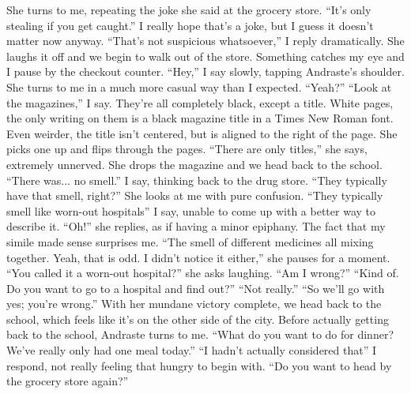 \documentclass[a4paper, 12pt]{book}
\newcommand\tab[1][1cm]{\hspace*{#1}}
\begin{document}
\newline
\tab
She turns to me, repeating the joke she said at the grocery store. ``It’s only stealing if you get caught.'' I really hope that’s a joke, but I guess it doesn’t matter now anyway.
\newline
\tab
``That’s not suspicious whatsoever,'' I reply dramatically. She laughs it off and we begin to walk out of the store. Something catches my eye and I pause by the checkout counter. ``Hey,'' I say slowly, tapping Andraste’s shoulder.
\newline
\tab
She turns to me in a much more casual way than I expected. ``Yeah?''
\newline
\tab
``Look at the magazines,'' I say. They’re all completely black, except a title. White pages, the only writing on them is a black magazine title in a Times New Roman font. Even weirder, the title isn’t centered, but is aligned to the right of the page.
\newline
\tab
She picks one up and flips through the pages. ``There are only titles,'' she says, extremely unnerved. She drops the magazine and we head back to the school.
\newline
\tab
``There was... no smell.'' I say, thinking back to the drug store. ``They typically have that smell, right?''  She looks at me with pure confusion. ``They typically smell like worn-out hospitals'' I say, unable to come up with a better way to describe it.
\newline
\tab
``Oh!'' she replies, as if having a minor epiphany. The fact that my simile made sense surprises me. ``The smell of different medicines all mixing together. Yeah, that is odd. I didn’t notice it either,'' she pauses for a moment. ``You called it a worn-out hospital?'' she asks laughing.
\newline
\tab
``Am I wrong?''
\newline
\tab
``Kind of. Do you want to go to a hospital and find out?''
\newline
\tab
``Not really.''
\newline
\tab
``So we’ll go with yes; you’re wrong.'' With her mundane victory complete, we head back to the school, which feels like it’s on the other side of the city. Before actually getting back to the school, Andraste turns to me. ``What do you want to do for dinner? We’ve really only had one meal today.''
\newline
\tab
``I hadn’t actually considered that'' I respond, not really feeling that hungry to begin with. ``Do you want to head by the grocery store again?''
\end{document}
